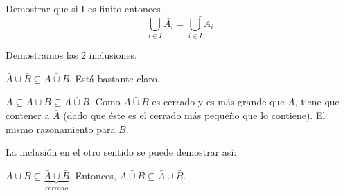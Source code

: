 \begin{problem}[11]
\ppart
\ppart

\solution
\spart
\spart  Demostrar que si I es finito entonces $$\bigcup_{i∈I} \bar{A_i} = \bar{\bigcup_{i∈I} A_i}$$

Demostramos las 2 inclusiones.

$\bar{A}∪\bar{B} \subseteq \bar{A∪B}$. Está bastante claro.

$A\subseteq A∪B \subseteq \bar{A∪B}$. Como $\bar{A∪B}$ es cerrado y es más grande que $A$, tiene que contener a $\bar{A}$ (dado que éste es el cerrado más pequeño que lo contiene). El mismo razonamiento para $B$.

La inclusión en el otro sentido se puede demostrar así:

$A∪B \subseteq \underbrace{\bar{A}∪\bar{B}}_{cerrado}$. Entonces, $\bar{A∪B}\subseteq \bar{A}∪\bar{B}$.
\end{problem}


